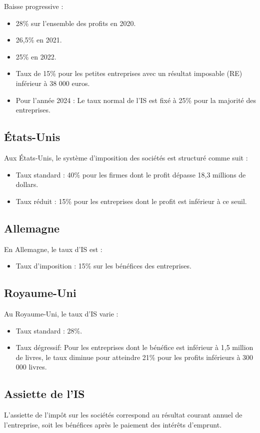 \documentclass[a4paper, 12pt]{report}
\begin{document}
Baisse progressive :
\begin{itemize}
	\item 28\% sur l'ensemble des profits en 2020.
	\item 26,5\% en 2021.
	\item 25\% en 2022.
	\item Taux de 15\% pour les petites entreprises avec un résultat imposable (RE) inférieur à 38 000 euros.
	\item Pour l'année 2024 : Le taux normal de l'IS est fixé à 25\% pour la majorité des entreprises.
\end{itemize}

\subsection{États-Unis}

Aux États-Unis, le système d'imposition des sociétés est structuré comme suit :
\begin{itemize}
	\item Taux standard : 40\% pour les firmes dont le profit dépasse 18,3 millions de dollars.
	\item Taux réduit : 15\% pour les entreprises dont le profit est inférieur à ce seuil.
\end{itemize}

\subsection{Allemagne} 
En Allemagne, le taux d'IS est :
\begin{itemize}
	\item Taux d'imposition : 15\% sur les bénéfices des entreprises.
\end{itemize}

\subsection{Royaume-Uni}
Au Royaume-Uni, le taux d'IS varie :
\begin{itemize}
	\item Taux standard : 28\%.
	\item Taux dégressif: Pour les entreprises dont le bénéfice est inférieur à 1,5 million de livres, le taux diminue pour atteindre 21\% pour les profits inférieurs à 300 000 livres.
\end{itemize}

\subsection{Assiette de l'IS } 
L'assiette de l'impôt sur les sociétés correspond au résultat courant annuel de l'entreprise, soit les bénéfices après le paiement des intérêts d'emprunt.
\end{document}
